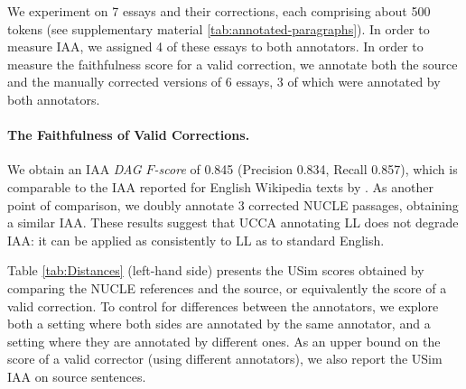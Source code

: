 \documentclass[a4paper, 11pt]{article}
\begin{document}
We experiment on 7 essays and their corrections, each comprising about 500 tokens (see supplementary material \ref{tab:annotated-paragraphs}).
In order to measure IAA, we assigned 4 of these essays to both annotators.
In order to measure the faithfulness score for a valid correction,
we annotate both the source
and the manually corrected versions of 6 essays,
3 of which were annotated by both annotators.

\paragraph{The Faithfulness of Valid Corrections.}
We obtain an IAA {\it DAG $F$-score} of 0.845
(Precision 0.834, Recall 0.857), which
is comparable to the IAA reported for English Wikipedia texts by \cite{abend2013universal}.
As another point of comparison, we doubly annotate 3 corrected
NUCLE \cite{dahlmeier2013building} passages, obtaining a similar IAA.
These results suggest that UCCA annotating LL does not degrade IAA:
it can be applied as consistently to LL as to standard English.

Table \ref{tab:Distances} (left-hand side) presents the {\sc USim} scores obtained by comparing 
the NUCLE references and the source, or equivalently the score of a valid correction.
To control for differences between the annotators, we explore both
a setting where both sides are annotated by the same annotator,
and a setting where they are annotated by different ones.
As an upper bound on the score of a valid corrector (using different annotators),
we also report the {\sc USim} IAA on source sentences. 
\end{document}
